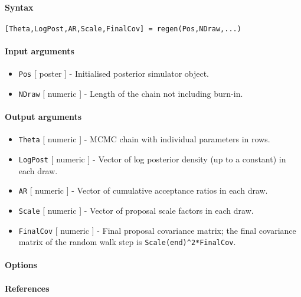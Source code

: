 


	\paragraph{Syntax}

\begin{verbatim}
[Theta,LogPost,AR,Scale,FinalCov] = regen(Pos,NDraw,...)
\end{verbatim}

\paragraph{Input arguments}

\begin{itemize}
\item
  \texttt{Pos} {[} poster {]} - Initialised posterior simulator object.
\item
  \texttt{NDraw} {[} numeric {]} - Length of the chain not including
  burn-in.
\end{itemize}

\paragraph{Output arguments}

\begin{itemize}
\item
  \texttt{Theta} {[} numeric {]} - MCMC chain with individual parameters
  in rows.
\item
  \texttt{LogPost} {[} numeric {]} - Vector of log posterior density (up
  to a constant) in each draw.
\item
  \texttt{AR} {[} numeric {]} - Vector of cumulative acceptance ratios
  in each draw.
\item
  \texttt{Scale} {[} numeric {]} - Vector of proposal scale factors in
  each draw.
\item
  \texttt{FinalCov} {[} numeric {]} - Final proposal covariance matrix;
  the final covariance matrix of the random walk step is
  \texttt{Scale(end)\^{}2*FinalCov}.
\end{itemize}

\paragraph{Options}

\paragraph{References}

